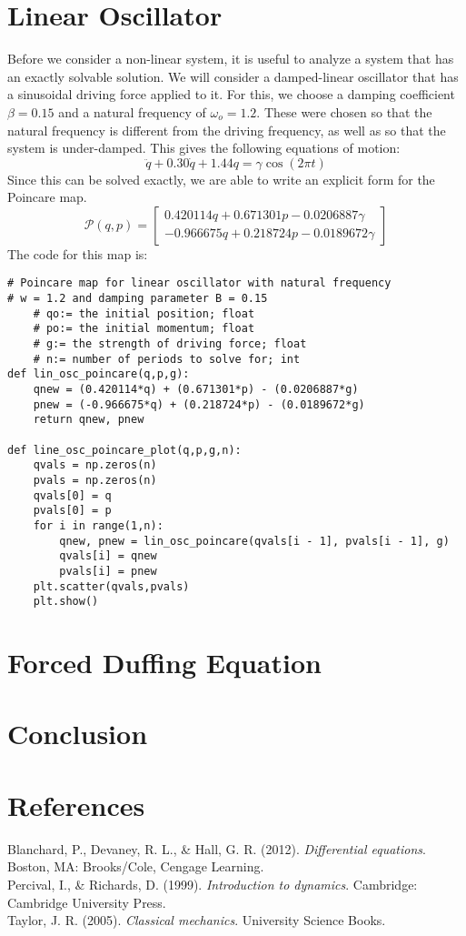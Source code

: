 \documentclass{article}
\newcommand{\mc}[1]{\mathcal{#1}}
\newcommand{\matx}[1]{\left[\begin{matrix} #1 \end{matrix}\right]}
\begin{document}
\section{Linear Oscillator}
Before we consider a non-linear system, it is useful to analyze a system that has an exactly solvable solution. We will consider a damped-linear oscillator that has a sinusoidal driving force applied to it. For this, we choose a damping coefficient $\beta = 0.15$ and a natural frequency of $\omega_o = 1.2$. These were chosen so that the natural frequency is different from the driving frequency, as well as so that the system is under-damped. This gives the following equations of motion:
\begin{equation}
    \ddot{q}+0.30 \dot{q}+1.44 q = \gamma \cos(2\pi t)
\end{equation}
Since this can be solved exactly, we are able to write an explicit form for the Poincare map. 
\begin{equation}
    \mc{P}(q,p) = 
    \matx{
        0.420114 q + 0.671301 p - 0.0206887 \gamma \\
        -0.966675 q + 0.218724 p - 0.0189672 \gamma
    }
\end{equation}
The code for this map is:
\begin{lstlisting}
# Poincare map for linear oscillator with natural frequency
# w = 1.2 and damping parameter B = 0.15
    # qo:= the initial position; float
    # po:= the initial momentum; float
    # g:= the strength of driving force; float
    # n:= number of periods to solve for; int
def lin_osc_poincare(q,p,g):
    qnew = (0.420114*q) + (0.671301*p) - (0.0206887*g)
    pnew = (-0.966675*q) + (0.218724*p) - (0.0189672*g)
    return qnew, pnew

def line_osc_poincare_plot(q,p,g,n):
    qvals = np.zeros(n)
    pvals = np.zeros(n)
    qvals[0] = q
    pvals[0] = p
    for i in range(1,n):
        qnew, pnew = lin_osc_poincare(qvals[i - 1], pvals[i - 1], g)
        qvals[i] = qnew
        pvals[i] = pnew
    plt.scatter(qvals,pvals)
    plt.show()
\end{lstlisting}
\section{Forced Duffing Equation}
\section{Conclusion}
\newpage
\section{References}
Blanchard, P., Devaney, R. L., \& Hall, G. R. (2012). \textit{Differential equations}. Boston, MA: Brooks/Cole, Cengage Learning.\\
Percival, I., \& Richards, D. (1999). \textit{Introduction to dynamics}. Cambridge: Cambridge University Press. \\
Taylor, J. R. (2005). \textit{Classical mechanics}. University Science Books.
\end{document}

